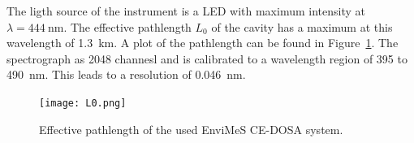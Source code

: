 The ligth source of the instrument is a LED with maximum intensity at
$\lambda = \SI{444}{\nano\meter}$. The effective pathlength $L_0$ of
the cavity has a maximum at this wavelength of
\SI{1.3}{\kilo\meter}. A plot of the pathlength can be found in
Figure~\ref{fig:pathlength}. The spectrograph as \num{2048} channesl
and is calibrated to a wavelength region of \num{395} to
\SI{490}{\nano\meter}. This leads to a resolution of
\SI{0.046}{\nano\meter}.

\begin{figure}[htbp]
  \centering
  \texttt{[image: L0.png]}
  \caption{Effective pathlength of the used EnviMeS CE-DOSA system.}
  \label{fig:pathlength}
\end{figure}

